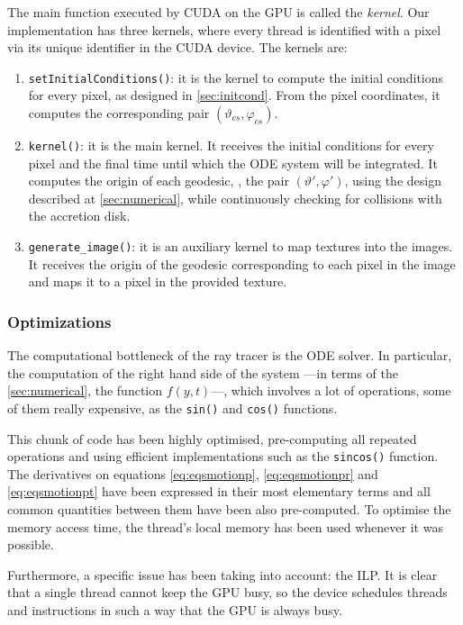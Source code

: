 The main function executed by \ac{CUDA} on the \ac{GPU} is called the \emph{kernel}. Our implementation has three kernels, where every thread is identified with a pixel via its unique identifier in the \ac{CUDA} device. The kernels are:
\begin{enumerate}
	\item \lstinline{setInitialConditions()}: it is the kernel to compute the initial conditions for every pixel, as designed in \autoref{sec:initcond}. From the pixel coordinates, it computes the corresponding pair $(\vartheta_{cs}, \varphi_{cs})$.
	\item  \lstinline{kernel()}: it is the main kernel. It receives the initial conditions for every pixel and the final time until which the \ac{ODE} system will be integrated. It computes the origin of each geodesic, \ie, the pair $(\vartheta', \varphi')$, using the design described at \autoref{sec:numerical}, while continuously checking for collisions with the accretion disk.
	\item \lstinline{generate_image()}: it is an auxiliary kernel to map textures into the images. It receives the origin of the geodesic corresponding to each pixel in the image and maps it to a pixel in the provided texture.
\end{enumerate}

\subsubsection*{Optimizations}

The computational bottleneck of the ray tracer is the \ac{ODE} solver. In particular, the computation of the right hand side of the system ---in terms of the \autoref{sec:numerical}, the function $f(y,t)$---, which involves a lot of operations, some of them really expensive, as the \lstinline{sin()} and \lstinline{cos()} functions.

This chunk of code has been highly optimised, pre-computing all repeated operations and using efficient implementations such as the \lstinline{sincos()} function. The derivatives on equations \ref{eq:eqsmotionp}, \ref{eq:eqsmotionpr} and \ref{eq:eqsmotionpt} have been expressed in their most elementary terms and all common quantities between them have been also pre-computed. To optimise the memory access time, the thread's local memory has been used whenever it was possible.

Furthermore, a specific issue has been taking into account: the \ac{ILP}. It is clear that a single thread cannot keep the \ac{GPU} busy, so the device schedules threads and instructions in such a way that the \ac{GPU} is always busy.

